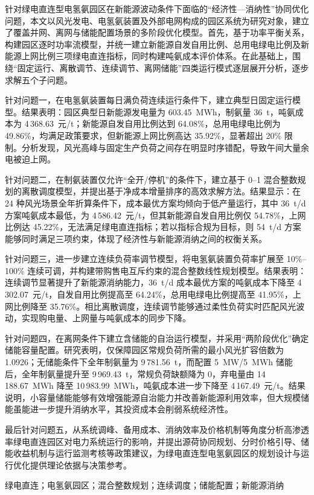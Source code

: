 \begin{center}
  {\heiti{}\paperTitle}
\end{center}



针对绿电直连型电氢氨园区在新能源波动条件下面临的“经济性—消纳性”协同优化问题，本文以风光发电、电氢氨装置及外部电网构成的园区系统为研究对象，建立了覆盖并网、离网与储能配置场景的多阶段优化模型。首先，基于功率平衡关系，构建园区逐时功率流模型，并统一建立新能源自发自用比例、总用电绿电比例及新能源上网比例三项绿电直连指标，同时构建吨氨成本评价体系。在此基础上，围绕“固定运行、离散调节、连续调节、离网储能”四类运行模式逐层展开分析，逐步求解五个子问题。

\par
针对问题一，在电氢氨装置每日满负荷连续运行条件下，建立典型日固定运行模型。结果表明：园区典型日新能源发电量为 603.45~MWh，制氨量 36~t，吨氨成本为 4\,368.63~元/t；新能源自发自用比例达到 64.08\%，总用电绿电比例为 49.86\%，均满足政策要求，但新能源上网比例高达 35.92\%，显著超出 20\% 限制。分析发现，风光高峰与固定生产负荷之间存在明显时序错配，导致午间大量余电被迫上网。

\par
针对问题二，在制氨装置仅允许“全开/停机”的条件下，建立基于 0--1 混合整数规划的离散调度模型，并提出基于净成本增量排序的高效求解方法。结果显示：在 24 种风光场景全年折算条件下，成本最优方案均倾向于低产量运行，其中 36~t/d 方案吨氨成本最低，为 4\,586.42~元/t，但其新能源自发自用比例仅 54.78\%，上网比例达 45.22\%，无法满足绿电直连指标；若以指标合规为目标，则 54~t/d 方案能够同时满足三项约束，体现了经济性与新能源消纳之间的权衡关系。

\par
针对问题三，进一步建立连续负荷率调节模型，将电氢氨装置负荷率扩展至 10\%--100\% 连续可调，并构建带购售电互斥约束的混合整数线性规划模型。结果表明：连续调节显著提升了新能源消纳能力，36~t/d 成本最优方案的吨氨成本下降至 4\,302.07~元/t，自发自用比例提高至 64.24\%，总用电绿电比例提高至 41.95\%，上网比例降至 35.76\%。相比离散调度，连续调节能够通过柔性负荷实时匹配风光波动，实现购电量、上网量与吨氨成本的同步下降。

\par
针对问题四，在离网条件下建立含储能的自治运行模型，并采用“两阶段优化”确定储能容量配置。研究表明，仅保障园区常规负荷所需的最小风光扩容倍数为 1.0926；无储能条件下全年制氨量为 9\,781.56~t，而配置 5~MW/5~MWh 储能后，全年制氨量提升至 9\,969.43~t，常规负荷缺额降为 0，弃电量由 14\,188.67~MWh 降至 10\,983.99~MWh，吨氨成本进一步下降至 4\,167.49~元/t。结果说明，小容量储能能够有效增强能源自治能力并改善新能源利用效率，但大规模储能虽能进一步提升消纳水平，其投资成本会削弱系统经济性。

\par
最后针对问题五，从系统调峰、备用成本、消纳效率及价格机制等角度分析高渗透率绿电直连园区对电力系统运行的影响，并提出源荷协同规划、分时价格引导、储能收益机制与运行监测考核等政策建议，为绿电直连型电氢氨园区的规划设计与运行优化提供理论依据与决策参考。

\vspace{1em}
绿电直连；电氢氨园区；混合整数规划；连续调度；储能配置；新能源消纳